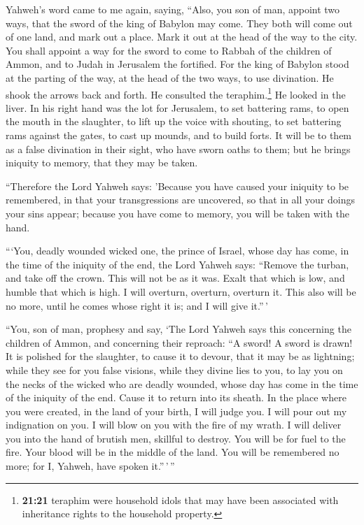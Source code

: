  Yahweh's word came to me again, saying, 
``Also, you son of man, appoint two ways, that the sword of the king of
Babylon may come. They both will come out of one land, and mark out a
place. Mark it out at the head of the way to the city. 
You shall appoint a way for the sword to come to Rabbah of the children
of Ammon, and to Judah in Jerusalem the fortified.  For
the king of Babylon stood at the parting of the way, at the head of the
two ways, to use divination. He shook the arrows back and forth. He
consulted the teraphim.\footnote{\textbf{21:21} teraphim were household
  idols that may have been associated with inheritance rights to the
  household property.} He looked in the liver.  In his
right hand was the lot for Jerusalem, to set battering rams, to open the
mouth in the slaughter, to lift up the voice with shouting, to set
battering rams against the gates, to cast up mounds, and to build forts.
 It will be to them as a false divination in their sight,
who have sworn oaths to them; but he brings iniquity to memory, that
they may be taken.

 ``Therefore the Lord Yahweh says: 'Because you have
caused your iniquity to be remembered, in that your transgressions are
uncovered, so that in all your doings your sins appear; because you have
come to memory, you will be taken with the hand.

 ```You, deadly wounded wicked one, the prince of Israel,
whose day has come, in the time of the iniquity of the end,
 the Lord Yahweh says: ``Remove the turban, and take off
the crown. This will not be as it was. Exalt that which is low, and
humble that which is high.  I will overturn, overturn,
overturn it. This also will be no more, until he comes whose right it
is; and I will give it.''\,'

 ``You, son of man, prophesy and say, `The Lord Yahweh
says this concerning the children of Ammon, and concerning their
reproach: ``A sword! A sword is drawn! It is polished for the slaughter,
to cause it to devour, that it may be as lightning; 
while they see for you false visions, while they divine lies to you, to
lay you on the necks of the wicked who are deadly wounded, whose day has
come in the time of the iniquity of the end.  Cause it to
return into its sheath. In the place where you were created, in the land
of your birth, I will judge you.  I will pour out my
indignation on you. I will blow on you with the fire of my wrath. I will
deliver you into the hand of brutish men, skillful to destroy.
 You will be for fuel to the fire. Your blood will be in
the middle of the land. You will be remembered no more; for I, Yahweh,
have spoken it.''\,'\,''

